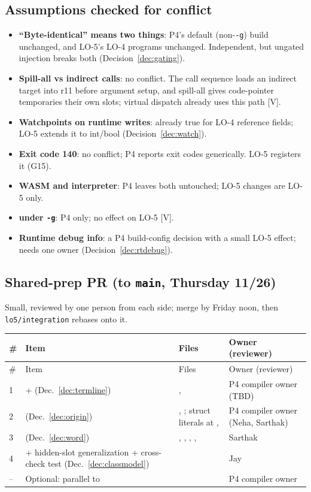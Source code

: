 \documentclass[10pt]{article}
\newcommand{\code}[1]{\texttt{\small #1}}
\newcommand{\mV}{\textsf{\scriptsize[V]}}
\begin{document}
\subsection{Assumptions checked for conflict}\label{sec:ov-assume}
\begin{itemize}
\item \textbf{``Byte-identical'' means two things}: P4's default (non-\code{-g}) build unchanged, and LO-5's LO-4 programs unchanged. Independent, but ungated injection breaks both (Decision~\ref{dec:gating}).
\item \textbf{Spill-all vs indirect calls}: no conflict. The call sequence loads an indirect target into r11 before argument setup, and spill-all gives code-pointer temporaries their own slots; virtual dispatch already uses this path \mV.
\item \textbf{Watchpoints on runtime writes}: already true for LO-4 reference fields; LO-5 extends it to int/bool (Decision~\ref{dec:watch}).
\item \textbf{Exit code 140}: no conflict; P4 reports exit codes generically. LO-5 registers it (G15).
\item \textbf{WASM and interpreter}: P4 leaves both untouched; LO-5 changes are LO-5 only.
\item \textbf{ under \code{-g}}: P4 only; no effect on LO-5 \mV.
\item \textbf{Runtime debug info}: a P4 build-config decision with a small LO-5 effect; needs one owner (Decision~\ref{dec:rtdebug}).
\end{itemize}

\subsection{Shared-prep PR (to \code{main}, Thursday 11/26)}\label{sec:ov-prep}
Small, reviewed by one person from each side; merge by Friday noon, then \code{lo5/integration} rebases onto it.
\begin{xltabular}{\linewidth}{@{}L{0.4cm}L{4.8cm}Y L{3.3cm}@{}}
\toprule
\# & Item & Files & Owner (reviewer) \\
\midrule
\endfirsthead
\toprule \# & Item & Files & Owner (reviewer) \\ \midrule
{} &  +  (Dec.~\ref{dec:termline}) & ,  & P4 compiler owner (TBD) \\
2 &  (Dec.~\ref{dec:origin}) & , ; struct literals at ,  & P4 compiler owner (Neha, Sarthak) \\
3 &  (Dec.~\ref{dec:word}) & , , , ,  & Sarthak \\
4 &  + hidden-slot generalization + cross-check test (Dec.~\ref{dec:classmodel}) &  & Jay \\
-- & Optional:  parallel to  &  & P4 compiler owner \\
\bottomrule
\end{xltabular}
\end{document}
